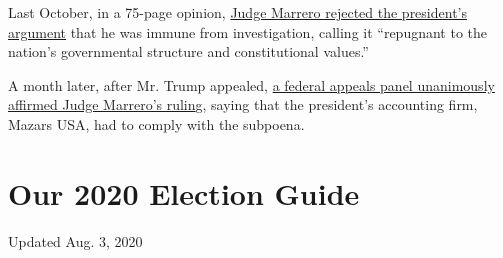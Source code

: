 Last October, in a 75-page opinion,
\href{https://www.nytimes.com/2019/10/07/nyregion/trump-taxes-lawsuit-vance.html}{Judge
Marrero rejected the president's argument} that he was immune from
investigation, calling it ``repugnant to the nation's governmental
structure and constitutional values.''

A month later, after Mr. Trump appealed,
\href{https://www.nytimes.com/2019/11/04/nyregion/trump-taxes-vance-appeal.html}{a
federal appeals panel unanimously affirmed Judge Marrero's rulin}g,
saying that the president's accounting firm, Mazars USA, had to comply
with the subpoena.

\hypertarget{our-2020-election-guide}{%
\section{Our 2020 Election Guide}\label{our-2020-election-guide}}

Updated Aug. 3, 2020

